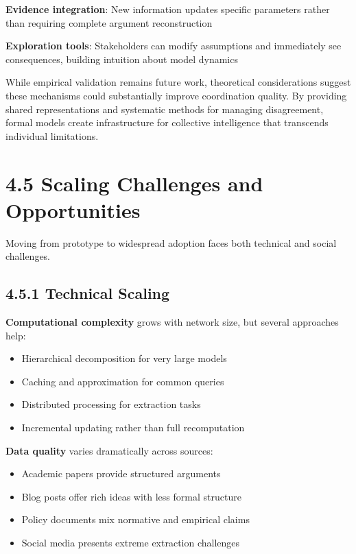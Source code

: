 \documentclass[
  11pt,
  letterpaper,
  openany]{book}
\providecommand{\tightlist}{%
  \setlength{\itemsep}{0pt}\setlength{\parskip}{0pt}}
\begin{document}
\textbf{Evidence integration}: New information updates specific
parameters rather than requiring complete argument reconstruction

\textbf{Exploration tools}: Stakeholders can modify assumptions and
immediately see consequences, building intuition about model dynamics

While empirical validation remains future work, theoretical
considerations suggest these mechanisms could substantially improve
coordination quality. By providing shared representations and systematic
methods for managing disagreement, formal models create infrastructure
for collective intelligence that transcends individual limitations.

\section{4.5 Scaling Challenges and Opportunities}\label{sec-scaling}

Moving from prototype to widespread adoption faces both technical and
social challenges.

\subsection{4.5.1 Technical Scaling}\label{sec-technical-scaling}

\textbf{Computational complexity} grows with network size, but several
approaches help:

\begin{itemize}
\tightlist
\item
  Hierarchical decomposition for very large models
\item
  Caching and approximation for common queries
\item
  Distributed processing for extraction tasks
\item
  Incremental updating rather than full recomputation
\end{itemize}

\textbf{Data quality} varies dramatically across sources:

\begin{itemize}
\tightlist
\item
  Academic papers provide structured arguments
\item
  Blog posts offer rich ideas with less formal structure
\item
  Policy documents mix normative and empirical claims
\item
  Social media presents extreme extraction challenges
\end{itemize}
\end{document}
